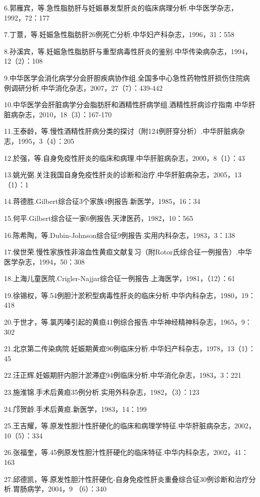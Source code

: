 6.郭雁宾，等.急性脂肪肝与妊娠暴发型肝炎的临床病理分析.中华医学杂志，1992，72：177

7.丁薏，等.妊娠急性脂肪肝26例死亡分析.中华妇产科杂志，1996，31：558

8.孙溪宾，等.妊娠急性脂肪肝与重型病毒性肝炎的鉴别.中华传染病杂志，1994，12（2）：108

9.中华医学会消化病学分会肝胆疾病协作组.全国多中心急性药物性肝损伤住院病例调研分析.中华消化杂志，2007，27（7）：439-442

10.中华医学会肝脏病学分会脂肪肝和酒精性肝病学组.酒精性肝病诊疗指南.中华肝脏病杂志，2010，18（3）：167-170

11.王泰龄，等.慢性酒精性肝病分类的探讨（附124例肝穿分析）.中华肝脏病杂志，1995，3（4）：205

12.於强，等.自身免疫性肝炎的临床和病理.中华肝脏病杂志，2000，8（1）：43

13.姚光弼.关注我国自身免疫性肝炎的诊断和治疗.中华肝脏病杂志，2005，13（1）：1

14.蒋德胜.Gilbert综合征3个家族4例报告.新医学，1985，16：34

15.何平.Gilbert综合征一家6例报告.天津医药，1982，10：565

16.陈希陶，等.Dubin-Johnson综合征9例报告.实用内科杂志，1983，3：138

17.侯世荣.慢性家族性非溶血性黄疸文献复习（附Rotor氏综合征一例报告）.中华医学杂志，1994，50：308

18.上海儿童医院.Crigler-Najjar综合征一例报告.上海医学，1981，（12）：61

19.徐锡权，等.54例胆汁淤积型病毒性肝炎的临床分析.中华内科杂志，1980，19：418

20.于世才，等.氯丙嗪引起的黄疸41例综合报告.中华神经精神科杂志，1965，9：302

21.北京第二传染病院.妊娠期黄疸96例临床分析.中华妇产科杂志，1978，13（1）：45

22.汪正辉.妊娠期肝内胆汁淤滞症94例临床分析.中华消化杂志，1983，3：221

23.施淮锦.手术后黄疸35例分析.实用外科杂志，1982，（3）：123

24.邝贺龄.手术后黄疸.新医学，1983，14：199

25.王吉耀，等.原发性胆汁性肝硬化的临床和病理学特征.中华肝脏病杂志，2002，10（5）：334

26.张福奎，等.45例原发性胆汁性肝硬化的临床特征.中华内科杂志，2002，41：163

27.邱德凯，等.原发性胆汁性肝硬化-自身免疫性肝炎重叠综合征30例诊断和治疗分析.胃肠病学，2004，9
（6）：340

